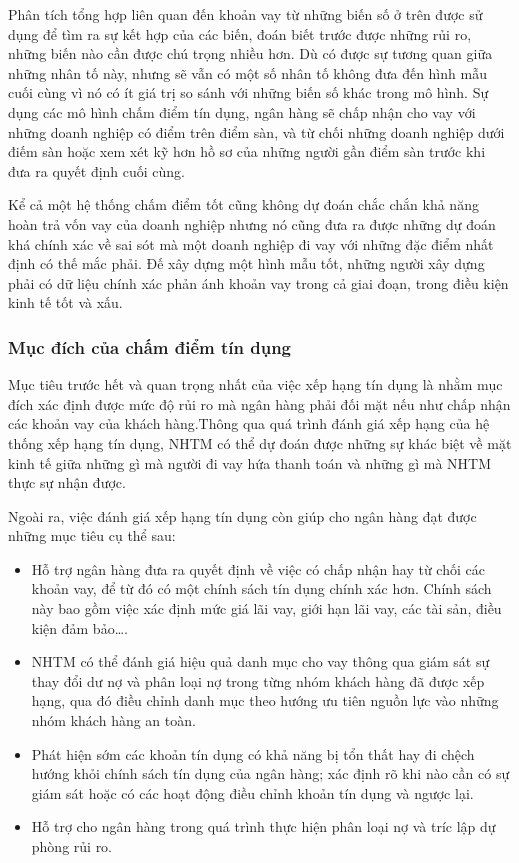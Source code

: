 Phân tích tổng hợp liên quan đến khoản vay từ những biến số ở trên được sử dụng để tìm ra sự kết hợp của các biến, đoán biết trước được những rủi ro, những biến nào cần được chú trọng nhiều hơn. Dù có được sự tương quan giữa những nhân tố này, nhưng sẽ vẫn có một số nhân tố không đưa đến hình mẫu cuối cùng vì nó có ít giá trị so sánh với những biến số khác trong mô hình. Sự dụng các mô hình chấm điểm tín dụng, ngân hàng sẽ chấp nhận cho vay với những doanh nghiệp có điểm trên điểm sàn, và từ chối những doanh nghiệp dưới điếm sàn hoặc xem xét kỹ hơn hồ sơ của những người gần điểm sàn trước khi đưa ra quyết định cuối cùng. 

Kể cả một hệ thống chấm điểm tốt cũng không dự đoán chắc chắn khả năng hoàn trả vốn vay của doanh nghiệp nhưng nó cũng đưa ra được những dự đoán khá chính xác về sai sót mà một doanh nghiệp đi vay với những đặc điểm nhất định có thế mắc phải. Đế xây dựng một hình mẫu tốt, những người xây dựng phải có dữ liệu chính xác phản ánh khoản vay trong cả giai đoạn, trong điều kiện kinh tế tốt và xấu.

\subsubsection{Mục đích của chấm điểm tín dụng}
Mục tiêu trước hết và quan trọng nhất của việc xếp hạng tín dụng là nhằm mục đích 
xác định được mức độ rủi ro mà ngân hàng phải đối mặt nếu như chấp nhận các khoản 
vay của khách hàng.Thông qua quá trình đánh giá xếp hạng của hệ thống xếp hạng tín 
dụng, NHTM có thể dự đoán được những sự khác biệt về mặt kinh tế giữa những gì mà 
người đi vay hứa thanh toán và những gì mà NHTM thực sự nhận được. 

Ngoài ra, việc đánh giá xếp hạng tín dụng còn giúp cho ngân hàng đạt được những 
mục tiêu cụ thể sau: 

\begin{itemize}
\item Hỗ trợ ngân hàng đưa ra quyết định về việc có chấp nhận hay từ chối các khoản 
vay, để từ đó có một chính sách tín dụng chính xác hơn. Chính sách này bao gồm 
việc xác định mức giá lãi vay, giới hạn lãi vay, các tài sản, điều kiện đảm bảo…. 
\item NHTM có thể đánh giá hiệu quả danh mục cho vay thông qua giám sát sự thay 
đổi dư nợ và phân loại nợ trong từng nhóm khách hàng đã được xếp hạng, qua 
đó điều chỉnh danh mục theo hướng ưu tiên nguồn lực vào những nhóm khách 
hàng an toàn. 
\item Phát hiện sớm các khoản tín dụng có khả năng bị tổn thất hay đi chệch hướng 
khỏi chính sách tín dụng của ngân hàng; xác định rõ khi nào cần có sự giám sát 
hoặc có các hoạt động điều chỉnh khoản tín dụng và ngược lại. 
\item Hỗ trợ cho ngân hàng trong quá trình thực hiện phân loại nợ và tríc lập dự phòng 
rủi ro.
\end{itemize}
